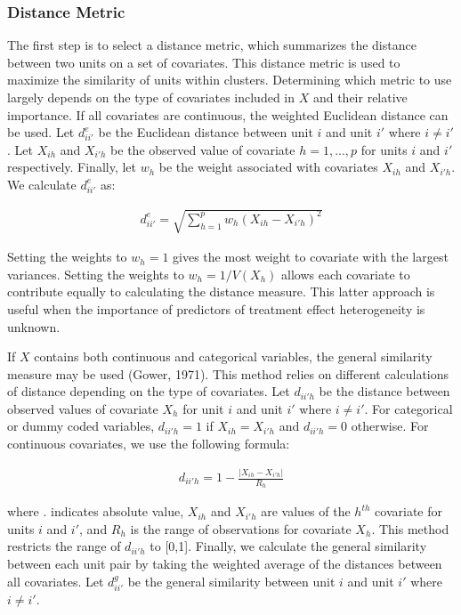 \documentclass[man,floatsintext]{apa6}
\begin{document}
\hypertarget{distance-metric}{%
\subsubsection{Distance Metric}\label{distance-metric}}

The first step is to select a distance metric, which summarizes the distance between two units on a set of covariates. This distance metric is used to maximize the similarity of units within clusters. Determining which metric to use largely depends on the type of covariates included in \(X\) and their relative importance. If all covariates are continuous, the weighted Euclidean distance can be used. Let \(d^{e}_{ii'}\) be the Euclidean distance between unit \(i\) and unit \(i'\) where \(i \ne i'\). Let \(X_{ih}\) and \(X_{i'h}\) be the observed value of covariate \(h = {1, ..., p}\) for units \(i\) and \(i'\) respectively. Finally, let \(w_h\) be the weight associated with covariates \(X_{ih}\) and \(X_{i'h}\). We calculate \(d^{e}_{ii'}\) as:

\begin{align}
  d^{e}_{ii'} = \sqrt{\sum^{p}_{h=1} w_h (X_{ih} - X_{i'h})^2}
\end{align}

Setting the weights to \(w_h = 1\) gives the most weight to covariate with the largest variances. Setting the weights to \(w_h = 1/V(X_h)\) allows each covariate to contribute equally to calculating the distance measure. This latter approach is useful when the importance of predictors of treatment effect heterogeneity is unknown.

If \(X\) contains both continuous and categorical variables, the general similarity measure may be used (Gower, 1971). This method relies on different calculations of distance depending on the type of covariates. Let \(d_{ii'h}\) be the distance between observed values of covariate \(X_{h}\) for unit \(i\) and unit \(i'\) where \(i \ne i'\). For categorical or dummy coded variables, \(d_{ii'h} = 1\) if \(X_{ih} = X_{i'h}\) and \(d_{ii'h} = 0\) otherwise. For continuous covariates, we use the following formula:

\begin{align}
  d_{ii'h} = 1 - \frac{|X_{ih} - X_{i'h}|}{R_h}
\end{align}

where \textbar{}.\textbar{} indicates absolute value, \(X_{ih}\) and \(X_{i'h}\) are values of the \(h^{th}\) covariate for units \(i\) and \(i'\), and \(R_h\) is the range of observations for covariate \(X_h\). This method restricts the range of \(d_{ii'h}\) to {[}0,1{]}. Finally, we calculate the general similarity between each unit pair by taking the weighted average of the distances between all covariates. Let \(d^{g}_{ii'}\) be the general similarity between unit \(i\) and unit \(i'\) where \(i \ne i'\).
\end{document}
